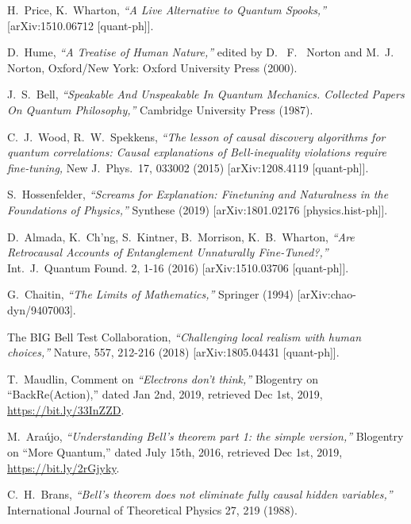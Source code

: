 \documentclass[12pt]{article}
\begin{document}
\begin{thebibliography}{99}
{   H.~Price, K.~Wharton, {\sl ``A Live Alternative to Quantum Spooks,''} [arXiv:1510.06712 [quant-ph]].
  
  
D.~Hume, {\sl ``A Treatise of Human Nature,''} edited by D.~ F.~ Norton and M.~J.~ Norton, Oxford/New York: Oxford University Press (2000).
    
  J.~S.~Bell,
  {\sl ``Speakable And Unspeakable In Quantum Mechanics. Collected Papers On Quantum Philosophy,''}
  Cambridge University Press (1987).
  
 
  
C.~J.~Wood, R.~W.~Spekkens, {\sl ``The lesson of causal discovery algorithms for quantum correlations: Causal explanations of Bell-inequality violations require fine-tuning,} New J.\ Phys.\ 17, 033002 (2015) [arXiv:1208.4119 [quant-ph]].

  S.~Hossenfelder,
  {\sl ``Screams for Explanation: Finetuning and Naturalness in the Foundations of Physics,''} Synthese (2019)
[arXiv:1801.02176 [physics.hist-ph]].
  
D.~Almada, K.~Ch'ng, S.~Kintner, B.~Morrison, K.~B.~Wharton, {\sl ``Are Retrocausal Accounts of Entanglement Unnaturally Fine-Tuned?,''} 	Int.\ J.\ Quantum Found. 2, 1-16 (2016) [arXiv:1510.03706 [quant-ph]].


 G.~Chaitin, {\sl ``The Limits of Mathematics,''} Springer (1994) [arXiv:chao-dyn/9407003].

 The {\sc BIG} Bell Test Collaboration, {\sl ``Challenging local realism with human choices,''} Nature, 557, 212-216 (2018) [arXiv:1805.04431 [quant-ph]].

 T.~Maudlin, Comment on {\sl ``Electrons don't think,''} Blogentry on ``BackRe(Action),''  dated Jan 2nd, 2019, retrieved Dec 1st, 2019, {\url{https://bit.ly/33InZZD}}.

 M.~Ara\'ujo, {\sl ``Understanding Bell’s theorem part 1: the simple version,''} Blogentry on ``More Quantum,''  dated July 15th, 2016, retrieved Dec 1st, 2019, {\url{https://bit.ly/2rGjyky}}.

 C.~H.~Brans, {\sl ``Bell's theorem does not eliminate fully causal hidden variables,''} International Journal of Theoretical Physics
27, 219 (1988).
}



\end{thebibliography}
\end{document}
